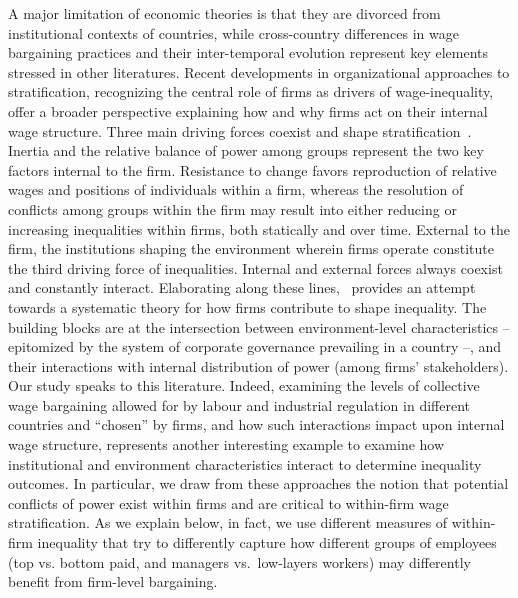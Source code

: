 \documentclass[12pt]{article}
\begin{document}
A major limitation of economic theories is that they are divorced from
institutional contexts of countries, while cross-country differences
in wage bargaining practices and their inter-temporal evolution
represent key elements stressed in other literatures. Recent
developments in organizational approaches to stratification,
recognizing the central role of firms as drivers of wage-inequality,
offer a broader perspective explaining how and why firms act on their
internal wage structure. Three main driving forces coexist and shape
stratification~\citep{stainback2010}. Inertia and the relative balance
of power among groups represent the two key factors internal to the
firm. Resistance to change favors reproduction of relative wages and
positions of individuals within a firm, whereas the resolution of
conflicts among groups within the firm may result into either reducing
or increasing inequalities within firms, both statically and over
time. External to the firm, the institutions shaping the environment
wherein firms operate constitute the third driving force of
inequalities. Internal and external forces always coexist and
constantly interact. Elaborating along these lines,~\cite{cobb2016}
provides an attempt towards a systematic theory for how firms
contribute to shape inequality. The building blocks are at the
intersection between environment-level characteristics -- epitomized
by the system of corporate governance prevailing in a country --, and
their interactions with internal distribution of power (among firms'
stakeholders). Our study speaks to this literature.  Indeed, examining
the levels of collective wage bargaining allowed for by labour and
industrial regulation in different countries and ``chosen'' by firms,
and how such interactions impact upon internal wage structure,
represents another interesting example to examine how institutional
and environment characteristics interact to determine inequality
outcomes. In particular, we draw from these approaches the notion that
potential conflicts of power exist within firms and are critical to
within-firm wage stratification. As we explain below, in fact, we use
different measures of within-firm inequality that try to differently
capture how different groups of employees (top vs. bottom paid, and
managers vs.~low-layers workers) may differently benefit from
firm-level bargaining.
\end{document}
